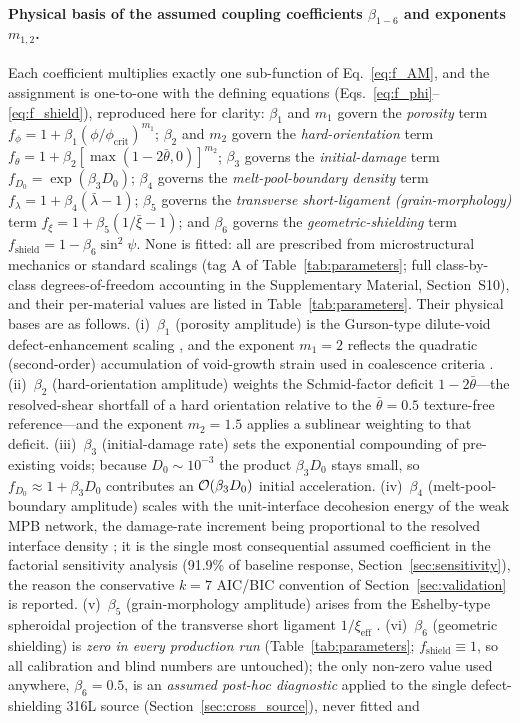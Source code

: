\documentclass[twocolumn]{sagej}
\begin{document}
\paragraph{Physical basis of the assumed coupling coefficients $\beta_{1-6}$ and exponents $m_{1,2}$.}
Each coefficient multiplies exactly one sub-function of Eq.~\eqref{eq:f_AM}, and the assignment is one-to-one with the defining equations (Eqs.~\eqref{eq:f_phi}--\eqref{eq:f_shield}), reproduced here for clarity: $\beta_1$ and $m_1$ govern the \emph{porosity} term $f_\phi = 1+\beta_1(\phi/\phi_{\mathrm{crit}})^{m_1}$; $\beta_2$ and $m_2$ govern the \emph{hard-orientation} term $f_\theta = 1+\beta_2[\max(1-2\bar\theta,0)]^{m_2}$; $\beta_3$ governs the \emph{initial-damage} term $f_{D_0}=\exp(\beta_3 D_0)$; $\beta_4$ governs the \emph{melt-pool-boundary density} term $f_\lambda=1+\beta_4(\bar\lambda-1)$; $\beta_5$ governs the \emph{transverse short-ligament (grain-morphology)} term $f_\xi=1+\beta_5(1/\bar\xi-1)$; and $\beta_6$ governs the \emph{geometric-shielding} term $f_{\mathrm{shield}}=1-\beta_6\sin^2\psi$. None is fitted: all are prescribed from microstructural mechanics or standard scalings (tag A of Table~\ref{tab:parameters}; full class-by-class degrees-of-freedom accounting in the Supplementary Material, Section~S10), and their per-material values are listed in Table~\ref{tab:parameters}. Their physical bases are as follows. (i)~$\beta_1$ (porosity amplitude) is the Gurson-type dilute-void defect-enhancement scaling \cite{gurson1977continuum,tvergaard1984analysis}, and the exponent $m_1=2$ reflects the quadratic (second-order) accumulation of void-growth strain used in coalescence criteria \cite{needleman1987}. (ii)~$\beta_2$ (hard-orientation amplitude) weights the Schmid-factor deficit $1-2\bar\theta$---the resolved-shear shortfall of a hard orientation relative to the $\bar\theta=0.5$ texture-free reference---and the exponent $m_2=1.5$ applies a sublinear weighting to that deficit. (iii)~$\beta_3$ (initial-damage rate) sets the exponential compounding of pre-existing voids; because $D_0\sim10^{-3}$ the product $\beta_3 D_0$ stays small, so $f_{D_0}\approx1+\beta_3 D_0$ contributes an ${\cal O}(\beta_3 D_0)$ initial acceleration. (iv)~$\beta_4$ (melt-pool-boundary amplitude) scales with the unit-interface decohesion energy of the weak MPB network, the damage-rate increment being proportional to the resolved interface density \cite{needleman1987,zhang2021modeling}; it is the single most consequential assumed coefficient in the factorial sensitivity analysis (91.9\% of baseline response, Section~\ref{sec:sensitivity}), the reason the conservative $k=7$ AIC/BIC convention of Section~\ref{sec:validation} is reported. (v)~$\beta_5$ (grain-morphology amplitude) arises from the Eshelby-type spheroidal projection of the transverse short ligament $1/\xi_{\mathrm{eff}}$ \cite{eshelby1957}. (vi)~$\beta_6$ (geometric shielding) is \emph{zero in every production run} (Table~\ref{tab:parameters}; $f_{\mathrm{shield}}\equiv1$, so all calibration and blind numbers are untouched); the only non-zero value used anywhere, $\beta_6=0.5$, is an \emph{assumed post-hoc diagnostic} applied to the single defect-shielding 316L source (Section~\ref{sec:cross_source}), never fitted and 
\end{document}
